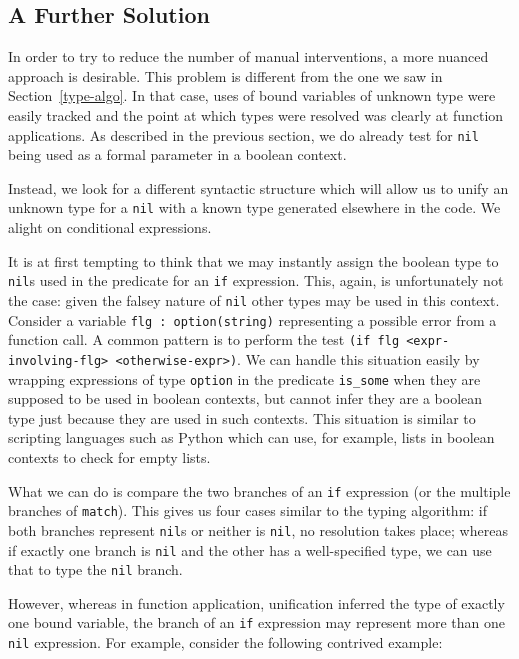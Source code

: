 \documentclass[a4paper,12pt,twoside,openright]{report}
\begin{document}
\hypertarget{nil-algo}{
\subsection{A Further Solution}\label{nil-algo}}

In order to try to reduce the number of manual interventions, a more nuanced approach is desirable.  This problem is different from the one we saw in Section~\ref{type-algo}.  In that case, uses of bound variables of unknown type were easily tracked and the point at which types were resolved was clearly at function applications.  As described in the previous section, we do already test for \texttt{nil} being used as a formal parameter in a boolean context.

Instead, we look for a different syntactic structure which will allow us to unify an unknown type for a \texttt{nil} with a known type generated elsewhere in the code.  We alight on conditional expressions.

It is at first tempting to think that we may instantly assign the boolean type to \texttt{nil}s used in the predicate for an \texttt{if} expression.  This, again, is unfortunately not the case: given the falsey nature of \texttt{nil} other types may be used in this context.  Consider a variable \texttt{flg : option(string)} representing a possible error from a function call. A common pattern is to perform the test \texttt{(if flg <expr-involving-flg> <otherwise-expr>)}.  We can handle this situation easily by wrapping expressions of type \texttt{option} in the predicate \texttt{is\_some} when they are supposed to be used in boolean contexts, but cannot infer they are a boolean type just because they are used in such contexts.  This situation is similar to scripting languages such as Python which can use, for example, lists in boolean contexts to check for empty lists.

What we can do is compare the two branches of an \texttt{if} expression (or the multiple branches of \texttt{match}).  This gives us four cases similar to the typing algorithm: if both branches represent \texttt{nil}s or neither is \texttt{nil}, no resolution takes place; whereas if exactly one branch is \texttt{nil} and the other has a well-specified type, we can use that to type the \texttt{nil} branch.

However, whereas in function application, unification inferred the type of exactly one bound variable, the branch of an \texttt{if} expression may represent more than one \texttt{nil} expression.  For example, consider the following contrived example:
\end{document}
